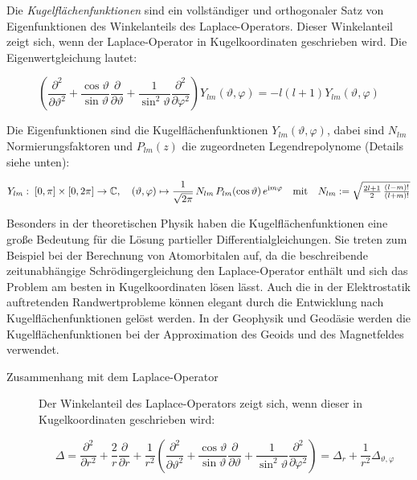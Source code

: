 \begin{definition}
Die \emph{Kugelflächenfunktionen} sind ein vollständiger und orthogonaler Satz von Eigenfunktionen des Winkelanteils des Laplace-Operators. Dieser Winkelanteil zeigt sich, wenn der Laplace-Operator in Kugelkoordinaten geschrieben wird. Die Eigenwertgleichung lautet:

\[\left(\frac{\partial^{2}}{\partial\vartheta^{2}}+\frac{\cos\vartheta}{\sin\vartheta}\frac{\partial}{\partial\vartheta}+\frac{1}{\sin^{2}\vartheta}\frac{\partial^{2}}{\partial\varphi^{2}}\right)Y_{lm}(\vartheta,\varphi)=-l(l+1)Y_{lm}(\vartheta,\varphi)\]

Die Eigenfunktionen sind die Kugelflächenfunktionen $Y_{lm}(\vartheta,\varphi)$, dabei sind $N_{lm}$ Normierungsfaktoren und $P_{lm}(z)$ die zugeordneten Legendrepolynome (Details siehe unten):

\[Y_{lm}:\;\left[0,\pi\right]\times\left[0,2\pi\right]\rightarrow\mathbb{C},\quad(\vartheta,\varphi)\mapsto\frac{1}{\sqrt{2\pi}}\, N_{lm}\, P_{lm}(\cos\vartheta)\, e^{\mathrm im\varphi}\\
\quad \text{mit}\quad N_{lm} := \sqrt{\tfrac{2l+1}{2}\,\tfrac{(l-m)!}{(l+m)!}}\]

Besonders in der theoretischen Physik haben die Kugelflächenfunktionen eine große Bedeutung für die Lösung partieller Differentialgleichungen. Sie treten zum Beispiel bei der Berechnung von Atomorbitalen auf, da die beschreibende zeitunabhängige Schrödingergleichung den Laplace-Operator enthält und sich das Problem am besten in Kugelkoordinaten lösen lässt. Auch die in der Elektrostatik auftretenden Randwertprobleme können elegant durch die Entwicklung nach Kugelflächenfunktionen gelöst werden. In der Geophysik und Geodäsie werden die Kugelflächenfunktionen bei der Approximation des Geoids  und des Magnetfeldes verwendet.

\begin{description}
	\item[Zusammenhang mit dem Laplace-Operator]

Der Winkelanteil des Laplace-Operators zeigt sich, wenn dieser in Kugelkoordinaten geschrieben wird:

\[\Delta=\frac{\partial^{2}}{\partial r^{2}}+\frac{2}{r}\frac{\partial}{\partial r}+\frac{1}{r^{2}}\left(\frac{\partial^{2}}{\partial\vartheta^{2}}+\frac{\cos\vartheta}{\sin\vartheta}\frac{\partial}{\partial\vartheta}+\frac{1}{\sin^{2}\vartheta}\frac{\partial^{2}}{\partial\varphi^{2}}\right)=\Delta_{r}+\frac{1}{r^{2}}\Delta_{\vartheta,\varphi}\]


\end{description}
\end{definition}
